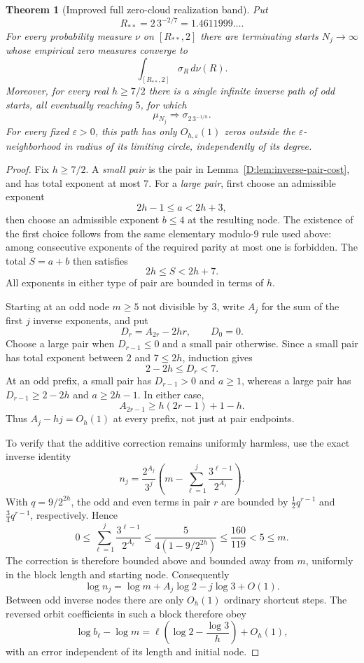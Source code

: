 \documentclass[11pt,a4paper]{article}
\newtheorem{theorem}{Theorem}[section]
\theoremstyle{definition}
\theoremstyle{remark}
\numberwithin{equation}{section}
\begin{document}
\begin{theorem}[Improved full zero-cloud realization band]
\label{D:thm:improved-radial-band}
Put
\[
 R_{**}=2\,3^{-2/7}=1.4611999\ldots.
\]
For every probability measure $\nu$ on $[R_{**},2]$ there are terminating
starts $N_j\to\infty$ whose empirical zero measures converge to
\[
 \int_{[R_{**},2]}\sigma_R\,d\nu(R).
\]
Moreover, for every real $h\ge7/2$ there is a single infinite inverse
path of odd starts, all eventually reaching $5$, for which
\[
 \mu_{N_j}\Longrightarrow\sigma_{2\,3^{-1/h}}.
\]
For every fixed $\varepsilon>0$, this path has only
$O_{h,\varepsilon}(1)$ zeros outside the $\varepsilon$-neighborhood
in radius of its limiting circle, independently of its degree.
\end{theorem}
\begin{proof}
Fix $h\ge7/2$.  A \emph{small pair} is the pair in
Lemma~\ref{D:lem:inverse-pair-cost}, and has total exponent at most $7$.
For a \emph{large pair}, first choose an admissible exponent
\[
 2h-1\le a<2h+3,
\]
then choose an admissible exponent $b\le4$ at the resulting node.
The existence of the first choice follows from the same elementary
modulo-$9$ rule used above: among consecutive exponents of the required
parity at most one is forbidden.  The total $S=a+b$ then satisfies
\[
 2h\le S<2h+7.
\]
All exponents in either type of pair are bounded in terms of $h$.

Starting at an odd node $m\ge5$ not divisible by $3$, write $A_j$ for
the sum of the first $j$ inverse exponents, and put
\[
 D_r=A_{2r}-2hr,\qquad D_0=0.
\]
Choose a large pair when $D_{r-1}\le0$ and a small pair otherwise.
Since a small pair has total exponent between $2$ and $7\le2h$,
induction gives
\[
 2-2h\le D_r<7.
\]
At an odd prefix, a small pair has $D_{r-1}>0$ and $a\ge1$, whereas
a large pair has $D_{r-1}\ge2-2h$ and $a\ge2h-1$.  In either case,
\[
 A_{2r-1}\ge h(2r-1)+1-h.
\]
Thus $A_j-hj=O_h(1)$ at every prefix, not just at pair endpoints.

To verify that the additive correction remains uniformly harmless,
use the exact inverse identity
\[
 n_j=\frac{2^{A_j}}{3^j}
 \left(m-\sum_{\ell=1}^j\frac{3^{\ell-1}}{2^{A_\ell}}\right).
\]
With $q=9/2^{2h}$, the odd and even terms in pair $r$ are bounded by
$\tfrac12q^{r-1}$ and $\tfrac34q^{r-1}$, respectively.  Hence
\[
 0\le\sum_{\ell=1}^j\frac{3^{\ell-1}}{2^{A_\ell}}
 \le\frac{5}{4(1-9/2^{2h})}
 \le\frac{160}{119}<5\le m.
\]
The correction is therefore bounded above and bounded away from $m$,
uniformly in the block length and starting node.  Consequently
\[
 \log n_j=\log m+A_j\log2-j\log3+O(1).
\]
Between odd inverse nodes there are only $O_h(1)$ ordinary shortcut
steps.  The reversed orbit coefficients in such a block therefore obey
\[
 \log b_\ell-\log m
 =\ell\left(\log2-\frac{\log3}{h}\right)+O_h(1),
\]
with an error independent of its length and initial node.


\end{proof}
\end{document}
